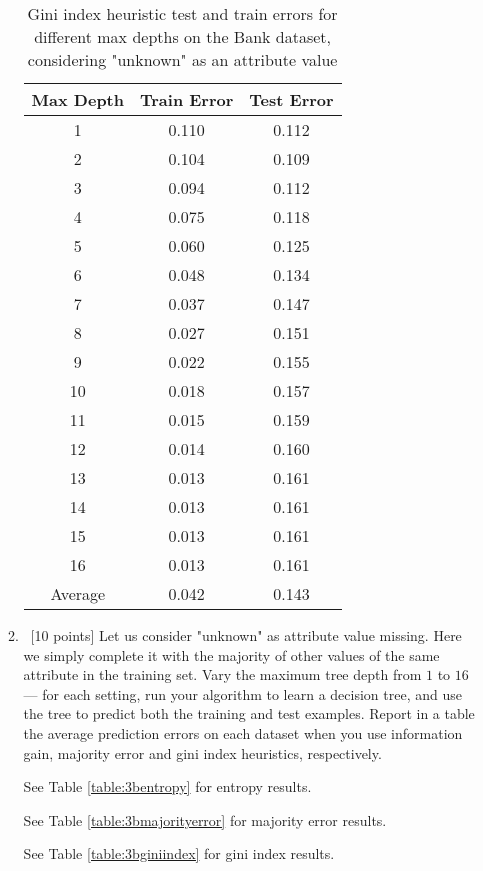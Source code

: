 \documentclass[12pt, fullpage,letterpaper]{article}
\begin{document}
\begin{enumerate}
\begin{enumerate}
\newpage
\begin{table}[ht]
	\centering
	\begin{tabular}{|c|c|c|}
        \hline
		Max Depth & Train Error & Test Error\\ 
		\hline\hline
		1 & 0.110 & 0.112 \\ \hline
		2 & 0.104 & 0.109 \\ \hline
		3 & 0.094 & 0.112 \\ \hline
		4 & 0.075 & 0.118 \\ \hline
		5 & 0.060 & 0.125 \\ \hline
		6 & 0.048 & 0.134 \\ \hline
		7 & 0.037 & 0.147 \\ \hline
		8 & 0.027 & 0.151 \\ \hline
		9 & 0.022 & 0.155 \\ \hline
		10 & 0.018 & 0.157 \\ \hline
		11 & 0.015 & 0.159 \\ \hline
		12 & 0.014 & 0.160 \\ \hline
		13 & 0.013 & 0.161 \\ \hline
		14 & 0.013 & 0.161 \\ \hline
		15 & 0.013 & 0.161 \\ \hline
		16 & 0.013 & 0.161 \\ \hline
		Average & 0.042 & 0.143 \\ \hline
	\end{tabular}
	\caption{Gini index heuristic test and train errors for different max depths on the Bank dataset, considering "unknown" as an attribute value}
    \label{table:3aginiindex}
\end{table}

	\item~[10 points] Let us consider "unknown" as  attribute value missing. Here we simply complete it with the majority of other values of the same attribute in the training set.   Vary the maximum  tree depth from $1$ to $16$ --- for each setting, run your algorithm to learn a decision tree, and use the tree to  predict both the training  and test examples. Report in a table the average prediction errors on each dataset when you use information gain, majority error and gini index heuristics, respectively.

	
See Table \ref{table:3bentropy} for entropy results. 

See Table \ref{table:3bmajorityerror} for majority error results. 

See Table \ref{table:3bginiindex} for gini index results. 


\end{enumerate}
\end{enumerate}
\end{document}
